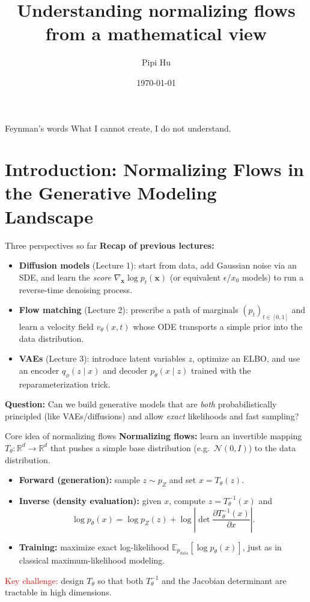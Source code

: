\documentclass[aspectratio=169]{beamer}
\title[Understanding normalizing flows]{Understanding normalizing flows from a mathematical view}
\author{Pipi Hu}
\institute[BIMSA]{Beijing Institute of Mathematical Sciences and Applications}
\date{\today}
\newcommand{\vx}{\mathbf{x}}
\newcommand{\R}{\mathbb{R}}
\begin{document}
  
  
\begin{frame}  
  \titlepage  
\end{frame}  

\begin{frame}{Feynman's words}
\centering
    What I cannot create, I do not understand.
\end{frame}
  

\section{Introduction: Normalizing Flows in the Generative Modeling Landscape}

\begin{frame}{Three perspectives so far}
\textbf{Recap of previous lectures:}
\begin{itemize}
    \item \textbf{Diffusion models} (Lecture 1): start from data, add Gaussian noise via an SDE, and learn the \emph{score} $\nabla_{\vx}\log p_t(\vx)$ (or equivalent $\epsilon$/$x_0$ models) to run a reverse-time denoising process.
    \item \textbf{Flow matching} (Lecture 2): prescribe a path of marginals $(p_t)_{t\in[0,1]}$ and learn a velocity field $v_\theta(x,t)$ whose ODE transports a simple prior into the data distribution.
    \item \textbf{VAEs} (Lecture 3): introduce latent variables $z$, optimize an ELBO, and use an encoder $q_\phi(z\mid x)$ and decoder $p_\theta(x\mid z)$ trained with the reparameterization trick.
\end{itemize}
\vspace{0.5em}
\textbf{Question:} Can we build generative models that are \emph{both} probabilistically principled (like VAEs/diffusions) and allow \emph{exact} likelihoods and fast sampling?
\end{frame}

\begin{frame}{Core idea of normalizing flows}
\textbf{Normalizing flows:} learn an invertible mapping $T_\theta:\R^d\to\R^d$ that pushes a simple base distribution (e.g.\ $\mathcal{N}(0,I)$) to the data distribution.
\begin{itemize}
    \item \textbf{Forward (generation):} sample $z\sim p_Z$ and set $x = T_\theta(z)$.
    \item \textbf{Inverse (density evaluation):} given $x$, compute $z = T_\theta^{-1}(x)$ and
    \[
      \log p_\theta(x) = \log p_Z(z) + \log\left|\det \frac{\partial T_\theta^{-1}(x)}{\partial x}\right|.
    \]
    \item \textbf{Training:} maximize exact log-likelihood $\mathbb{E}_{p_{\text{data}}}[\log p_\theta(x)]$, just as in classical maximum-likelihood modeling.
\end{itemize}
\textcolor{red}{Key challenge:} design $T_\theta$ so that both $T_\theta^{-1}$ and the Jacobian determinant are tractable in high dimensions.
\end{frame}
\end{document}
